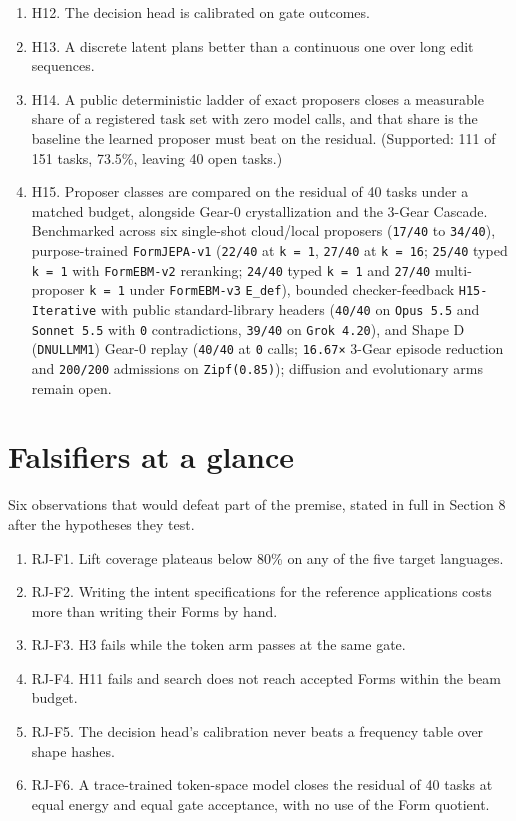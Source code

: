 \documentclass[10pt,letterpaper]{article}
\providecommand{\tightlist}{\setlength{\itemsep}{1pt}\setlength{\parskip}{0pt}}
\begin{document}
\begin{enumerate}
  remain below \texttt{80\%}.)
\item
  H12. The decision head is calibrated on gate outcomes.
\item
  H13. A discrete latent plans better than a continuous one over long
  edit sequences.
\item
  H14. A public deterministic ladder of exact proposers closes a
  measurable share of a registered task set with zero model calls, and
  that share is the baseline the learned proposer must beat on the
  residual. (Supported: 111 of 151 tasks, 73.5\%, leaving 40 open
  tasks.)
\item
  H15. Proposer classes are compared on the residual of 40 tasks under a
  matched budget, alongside Gear-0 crystallization and the 3-Gear
  Cascade. Benchmarked across six single-shot cloud/local proposers
  (\texttt{17/40} to \texttt{34/40}), purpose-trained
  \texttt{FormJEPA-\allowbreak{}v1} (\texttt{22/40} at \texttt{k\ =\ 1},
  \texttt{27/40} at \texttt{k\ =\ 16}; \texttt{25/40} typed
  \texttt{k\ =\ 1} with \texttt{FormEBM-\allowbreak{}v2} reranking; \texttt{24/40}
  typed \texttt{k\ =\ 1} and \texttt{27/40} multi-proposer
  \texttt{k\ =\ 1} under \texttt{FormEBM-\allowbreak{}v3} \texttt{E\_def}), bounded
  checker-feedback \texttt{H15-\allowbreak{}Iterative} with public standard-library
  headers (\texttt{40/40} on \texttt{Opus\ 5.5} and \texttt{Sonnet\ 5.\allowbreak{}5}
  with \texttt{0} contradictions, \texttt{39/40} on
  \texttt{Grok\ 4.\allowbreak{}20}), and Shape D (\texttt{DNULLMM1}) Gear-0 replay
  (\texttt{40/40} at \texttt{0} calls; \texttt{16.67×} 3-Gear episode
  reduction and \texttt{200/200} admissions on \texttt{Zipf(\allowbreak{}0.\allowbreak{}85)});
  diffusion and evolutionary arms remain open.
\end{enumerate}

\section{Falsifiers at a glance}\label{falsifiers-at-a-glance}

Six observations that would defeat part of the premise, stated in full
in Section 8 after the hypotheses they test.

\begin{enumerate}
\def\labelenumi{\arabic{enumi}.}
\tightlist
\item
  RJ-F1. Lift coverage plateaus below 80\% on any of the five target
  languages.
\item
  RJ-F2. Writing the intent specifications for the reference
  applications costs more than writing their Forms by hand.
\item
  RJ-F3. H3 fails while the token arm passes at the same gate.
\item
  RJ-F4. H11 fails and search does not reach accepted Forms within the
  beam budget.
\item
  RJ-F5. The decision head's calibration never beats a frequency table
  over shape hashes.
\item
  RJ-F6. A trace-trained token-space model closes the residual of 40
  tasks at equal energy and equal gate acceptance, with no use of the
  Form quotient.
\end{enumerate}
\end{document}
